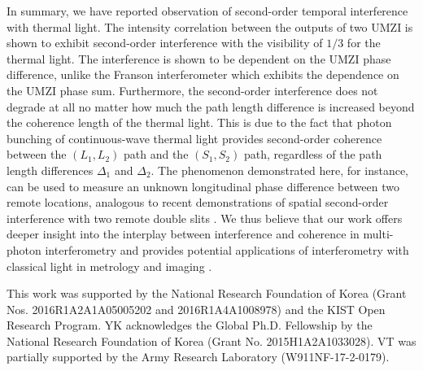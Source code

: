 \documentclass[aps,prl,reprint,showpacs,superscriptaddress]{revtex4-1}
\begin{document}
In summary, we have reported observation of second-order temporal interference with thermal light. The intensity correlation between the outputs of two  UMZI is shown to exhibit second-order interference with the visibility of $1/3$ for the thermal light. The interference is shown to be dependent on the UMZI phase difference, unlike the Franson interferometer which exhibits the dependence on the UMZI phase sum. Furthermore, the second-order interference does not degrade at all no matter how much the   path length difference is increased beyond the coherence length of the thermal light. This is due to the fact that  photon bunching   of continuous-wave thermal light provides  second-order coherence between the $(L_1,L_2)$ path and the $(S_1,S_2)$ path,  regardless of the path length differences $\Delta_1$ and $\Delta_2$. The phenomenon demonstrated here, for instance, can be used to measure an unknown longitudinal phase difference between two remote locations, analogous to recent demonstrations of spatial second-order interference with two remote double slits \cite{Cassano17,Peng16,Dangelo17}. We thus believe that our work offers deeper insight into the interplay between interference and coherence in multi-photon interferometry and provides potential applications of  interferometry with classical light in metrology and imaging \cite{Ra13a,Ra13b,Tamma14b,Tamma15a}. 







This work was supported by the National Research Foundation of Korea (Grant Nos. 2016R1A2A1A05005202 and 2016R1A4A1008978) and the KIST Open Research Program. YK  acknowledges the Global Ph.D. Fellowship by the National Research Foundation of Korea (Grant No. 2015H1A2A1033028). VT was partially supported by the Army Research Laboratory (W911NF-17-2-0179).
\end{document}
